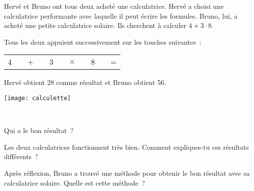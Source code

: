 \begin{activite}

 \begin{minipage}{0.6\textwidth}
Hervé et Bruno ont tous deux acheté une calculatrice. Hervé a choisi une calculatrice performante avec laquelle il peut écrire les formules. Bruno, lui, a acheté une petite calculatrice solaire. Ils cherchent à calculer $4 + 3 \cdot 8$.

Tous les deux appuient successivement sur les touches suivantes :    

\begin{tabular}{|c|c|c|c|c|c|c|c|c|c|c|}
\cline{1-1} \cline{3-3}\cline{5-5} \cline{7-7}\cline{9-9} \cline{11-11}
4 & & + & & 3 & & $\times$ & & 8 & & = \\ \cline{1-1} \cline{3-3}\cline{5-5} \cline{7-7}\cline{9-9} \cline{11-11}
\end{tabular}

Hervé obtient 28 comme résultat et Bruno obtient 56.
 \end{minipage} \hfill%
  \begin{minipage}{0.2\textwidth}
   \texttt{[image: calculette]}
   \end{minipage}\\

\begin{partie}[]
Qui a le bon résultat ?
\end{partie}

\begin{partie}[]
Les deux calculatrices fonctionnent très bien. Comment expliques-tu ces résultats différents ?
\end{partie}

\begin{partie}[]
Après réflexion, Bruno a trouvé une méthode pour obtenir le bon résultat avec sa calculatrice solaire. Quelle est cette méthode ?
\end{partie}

\end{activite}


